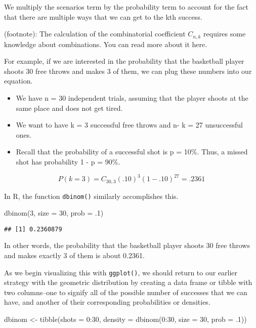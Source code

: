 \documentclass[
]{book}
\newenvironment{Shaded}{\begin{snugshade}}{\end{snugshade}}
\newcommand{\AttributeTok}[1]{\textcolor[rgb]{0.77,0.63,0.00}{#1}}
\newcommand{\DecValTok}[1]{\textcolor[rgb]{0.00,0.00,0.81}{#1}}
\newcommand{\FunctionTok}[1]{\textcolor[rgb]{0.00,0.00,0.00}{#1}}
\newcommand{\NormalTok}[1]{#1}
\newcommand{\OtherTok}[1]{\textcolor[rgb]{0.56,0.35,0.01}{#1}}
\newcommand{\SpecialCharTok}[1]{\textcolor[rgb]{0.00,0.00,0.00}{#1}}
\begin{document}
We multiply the scenarios term by the probability term to account for the fact that there are multiple ways that we can get to the kth success.

(footnote): The calculation of the combinatorial coefficient \(C_{n,k}\) requires some knowledge about combinations. You can read more about it here.

For example, if we are interested in the probability that the basketball player shoots 30 free throws and makes 3 of them, we can plug these numbers into our equation.

\begin{itemize}
\item
  We have n = 30 independent trials, assuming that the player shoots at the same place and does not get tired.
\item
  We want to have k = 3 successful free throws and n- k = 27 unsuccessful ones.
\item
  Recall that the probability of a successful shot is p = 10\%. Thus, a missed shot has probability 1 - p = 90\%.
\end{itemize}

\[P(k = 3) = C_{30,3}(.10)^{3}(1-.10)^{27}=.2361\]

In R, the function \texttt{dbinom()} similarly accomplishes this.

\begin{Shaded}
\begin{Highlighting}[]
\FunctionTok{dbinom}\NormalTok{(}\DecValTok{3}\NormalTok{, }\AttributeTok{size =} \DecValTok{30}\NormalTok{, }\AttributeTok{prob =}\NormalTok{ .}\DecValTok{1}\NormalTok{)}
\end{Highlighting}
\end{Shaded}

\begin{verbatim}
## [1] 0.2360879
\end{verbatim}

In other words, the probability that the basketball player shoots 30 free throws and makes exactly 3 of them is about 0.2361.

As we begin visualizing this with \texttt{ggplot()}, we should return to our earlier strategy with the geometric distribution by creating a data frame or tibble with two columns--one to signify all of the possible number of successes that we can have, and another of their corresponding probabilities or densities.

\begin{Shaded}
\begin{Highlighting}[]
\NormalTok{dbinom }\OtherTok{\textless{}{-}} \FunctionTok{tibble}\NormalTok{(}\AttributeTok{shots =} \DecValTok{0}\SpecialCharTok{:}\DecValTok{30}\NormalTok{,}
                 \AttributeTok{density =} \FunctionTok{dbinom}\NormalTok{(}\DecValTok{0}\SpecialCharTok{:}\DecValTok{30}\NormalTok{, }\AttributeTok{size =} \DecValTok{30}\NormalTok{, }\AttributeTok{prob =}\NormalTok{ .}\DecValTok{1}\NormalTok{))}
\end{Highlighting}
\end{Shaded}
\end{document}
